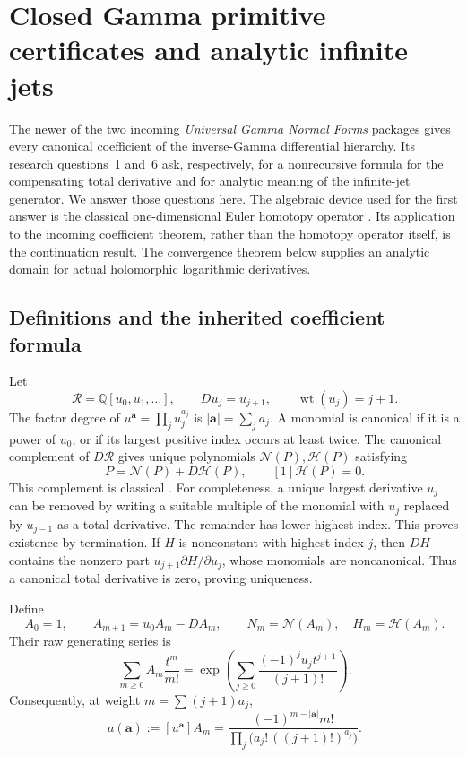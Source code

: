 \section{Closed Gamma primitive certificates and analytic infinite jets}
\label{hp:section}

The newer of the two incoming \emph{Universal Gamma Normal Forms}
packages gives every canonical coefficient of the inverse-Gamma
differential hierarchy. Its research questions~1 and~6 ask, respectively,
for a nonrecursive formula for the compensating total derivative and
for analytic meaning of the infinite-jet generator. We answer those
questions here. The algebraic device used for the first answer is the
classical one-dimensional Euler homotopy operator
\cite{PooleHereman,HeremanDeconinckPoole}. Its application to the incoming
coefficient theorem, rather than the homotopy operator itself, is the
continuation result. The convergence theorem below supplies an analytic
domain for actual holomorphic logarithmic derivatives.

\subsection{Definitions and the inherited coefficient formula}

Let
\[
 \mathcal R=\mathbb Q[u_0,u_1,\ldots],\qquad Du_j=u_{j+1},
 \qquad \operatorname{wt}(u_j)=j+1.
\]
The factor degree of $u^{\boldsymbol a}=\prod_j u_j^{a_j}$ is
$|\boldsymbol a|=\sum_j a_j$. A monomial is canonical if it is a
power of $u_0$, or if its largest positive index occurs at least twice.
The canonical complement of $D\mathcal R$ gives unique polynomials
$\mathcal N(P),\mathcal H(P)$ satisfying
\begin{equation}\label{hp:decomposition}
 P=\mathcal N(P)+D\mathcal H(P),\qquad
 [1]\mathcal H(P)=0.
\end{equation}
This complement is classical \cite[Proposition~4.10]{Guo2014}.
For completeness, a unique largest derivative $u_j$ can be removed by
writing a suitable multiple of the monomial with $u_j$ replaced by
$u_{j-1}$ as a total derivative. The remainder has lower highest
index. This proves existence by termination. If $H$ is nonconstant
with highest index $j$, then $DH$ contains the nonzero part
$u_{j+1}\partial H/\partial u_j$, whose monomials are noncanonical.
Thus a canonical total derivative is zero, proving uniqueness.

Define
\begin{equation}\label{hp:hierarchy}
 A_0=1,\qquad A_{m+1}=u_0A_m-DA_m,
 \qquad N_m=\mathcal N(A_m),\quad H_m=\mathcal H(A_m).
\end{equation}
Their raw generating series is
\begin{equation}\label{hp:raw-generator}
 \sum_{m\ge0}A_m\frac{t^m}{m!}
 =\exp\left(\sum_{j\ge0}
                   \frac{(-1)^j u_jt^{j+1}}{(j+1)!}\right).
\end{equation}
Consequently, at weight $m=\sum(j+1)a_j$,
\begin{equation}\label{hp:raw-coefficient}
 a(\boldsymbol a):=[u^{\boldsymbol a}]A_m
 =\frac{(-1)^{m-|\boldsymbol a|}m!}
        {\prod_j\bigl(a_j!\,((j+1)!)^{a_j}\bigr)}.
\end{equation}


